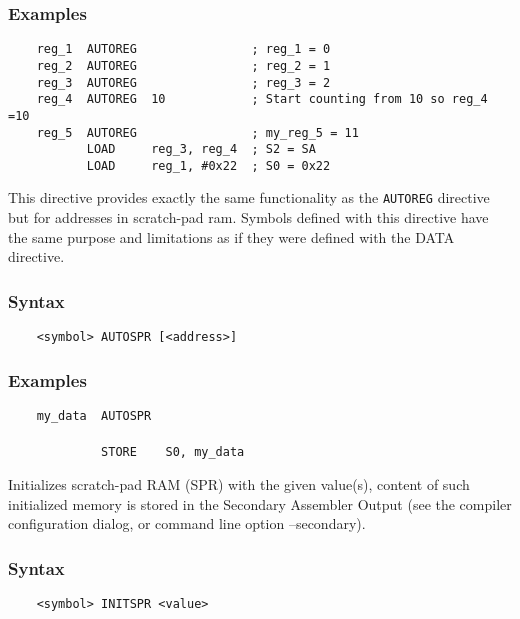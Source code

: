     \subsubsection{Examples}
        \verb'    reg_1  AUTOREG                ; reg_1 = 0'\\
        \verb'    reg_2  AUTOREG                ; reg_2 = 1'\\
        \verb'    reg_3  AUTOREG                ; reg_3 = 2'\\
        \verb'    reg_4  AUTOREG  10            ; Start counting from 10 so reg_4 =10'\\
        \verb'    reg_5  AUTOREG                ; my_reg_5 = 11'
        \verb''\\
        \verb'           LOAD     reg_3, reg_4  ; S2 = SA'\\
        \verb'           LOAD     reg_1, #0x22  ; S0 = 0x22'

    This directive provides exactly the same functionality as the \texttt{AUTOREG} directive but for addresses in scratch-pad ram. Symbols defined with this directive have the same purpose and limitations as if they were defined with the DATA directive.

    \subsubsection{Syntax}
        \verb'    <symbol> AUTOSPR [<address>]'

    \subsubsection{Examples}
        \verb'    my_data  AUTOSPR'\\
        \verb''\\
        \verb'             STORE    S0, my_data'

    Initializes scratch-pad RAM (SPR) with the given value(s), content of such initialized memory is stored in the Secondary Assembler Output (see the compiler configuration dialog, or command line option --secondary).

    \subsubsection{Syntax}
        \verb'    <symbol> INITSPR <value>'

